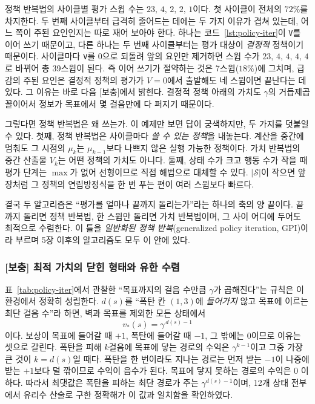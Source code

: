 \documentclass[11pt,a4paper]{article}
\newcommand{\Sset}{\mathcal{S}}
\begin{document}
정책 반복법의 사이클별 평가 스윕 수는 $23,\,4,\,2,\,2,\,1$이다. 첫 사이클이 전체의 $72\%$를 차지한다.
두 번째 사이클부터 급격히 줄어드는 데에는 두 가지 이유가 겹쳐 있는데, 어느 쪽이 주된 요인인지는
따로 재어 보아야 한다. 하나는 코드~\ref{lst:policy-iter}이 \lstinline|V|를 이어 쓰기 때문이고,
다른 하나는 두 번째 사이클부터는 평가 대상이 \emph{결정적} 정책이기 때문이다.
사이클마다 \lstinline|V|를 $0$으로 되돌려 앞의 요인만 제거하면 스윕 수가
$23,\,4,\,4,\,4,\,4$로 바뀌어 총 39스윕이 된다. 즉 이어 쓰기가 절약하는 것은 7스윕($18\%$)에
그치며, 급감의 주된 요인은 결정적 정책의 평가가 $V=0$에서 출발해도 네 스윕이면 끝난다는 데 있다.
그 이유는 바로 다음 [보충]에서 밝힌다. 결정적 정책 아래의 가치도 $\gamma$의 거듭제곱 꼴이어서
정보가 목표에서 몇 걸음만에 다 퍼지기 때문이다.

그렇다면 정책 반복법은 왜 쓰는가. 이 예제만 보면 답이 궁색하지만, 두 가지를 덧붙일 수 있다. 첫째,
정책 반복법은 사이클마다 \emph{쓸 수 있는 정책}을 내놓는다. 계산을 중간에 멈춰도 그 시점의 $\mu_k$는
$\mu_{k-1}$보다 나쁘지 않은 실행 가능한 정책이다. 가치 반복법의 중간 산출물 $V_k$는 어떤 정책의
가치도 아니다. 둘째, 상태 수가 크고 행동 수가 작을 때 평가 단계는 $\max$가 없어 선형이므로 직접
해법으로 대체할 수 있다. $|\Sset|$이 작으면 앞 장처럼 그 정책의 연립방정식을 한 번 푸는 편이 여러
스윕보다 빠르다.

결국 두 알고리즘은 ``평가를 얼마나 끝까지 돌리는가''라는 하나의 축의 양 끝이다. 끝까지 돌리면 정책
반복법, 한 스윕만 돌리면 가치 반복법이며, 그 사이 어디에 두어도 최적으로 수렴한다. 이 틀을
\emph{일반화된 정책 반복}(generalized policy iteration, GPI)이라 부르며 5장 이후의 알고리즘도 모두
이 안에 있다.

\subsubsection{[보충] 최적 가치의 닫힌 형태와 유한 수렴}
\label{sec:closed}

표~\ref{tab:policy-iter}에서 관찰한 ``목표까지의 걸음 수만큼 $\gamma$가 곱해진다''는 규칙은 이 환경에서
정확히 성립한다. $d(s)$를 ``폭탄 칸 $(1,3)$에 \emph{들어가지} 않고 목표에 이르는 최단 걸음 수''라 하면,
벽과 목표를 제외한 모든 상태에서
\begin{equation}
  v_*(s) = \gamma^{\,d(s)-1}
  \label{eq:closed}
\end{equation}
이다. 보상이 목표에 들어갈 때 $+1$, 폭탄에 들어갈 때 $-1$, 그 밖에는 $0$이므로 이유는 셋으로 갈린다.
폭탄을 피해 $k$걸음에 목표에 닿는 경로의 수익은 $\gamma^{k-1}$이고 그중 가장 큰 것이 $k=d(s)$일
때다. 폭탄을 한 번이라도 지나는 경로는 먼저 받는 $-1$이 나중에 받는 $+1$보다 덜 깎이므로 수익이
음수가 된다. 목표에 닿지 못하는 경로의 수익은 $0$ 이하다. 따라서 최댓값은 폭탄을 피하는 최단 경로가
주는 $\gamma^{d(s)-1}$이며, 12개 상태 전부에서 유리수 산술로 구한 정확해가 이 값과 일치함을
확인하였다.
\end{document}
